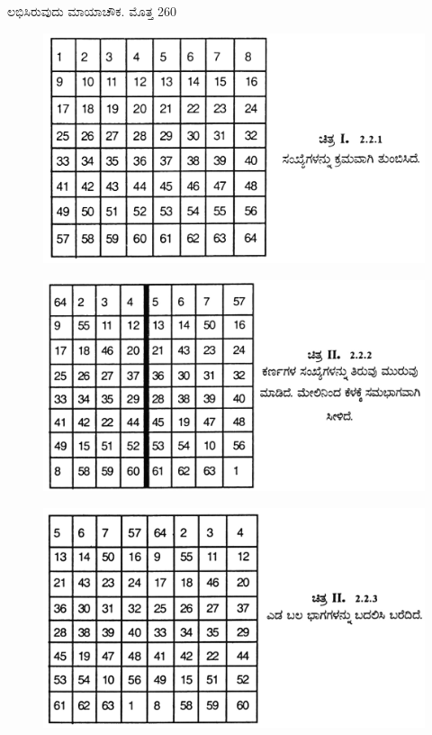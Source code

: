 \begin{itemize}
	ಲಭಿಸಿರುವುದು ಮಾಯಾಚೌಕ. ಮೊತ್ತ 260
	\begin{figure}[h]
	\includegraphics{src/figures/chap3/fig3.20.jpg}
	\end{figure}
	\begin{figure}[h]
	\includegraphics{src/figures/chap3/fig3.21.jpg}
	\end{figure}
	\begin{figure}[h]
	\includegraphics{src/figures/chap3/fig3.22.jpg}

\end{figure}
\end{itemize}
